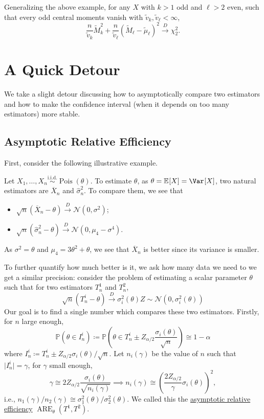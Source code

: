 Generalizing the above example, for any \(X\) with \(k > 1\) odd and \(\ell > 2\) even, such that every odd central moments vanish with \(\widetilde{v} _k , \widetilde{v} _\ell < \infty \),
\[
	\frac{n}{\widetilde{v} _k} \widetilde{M} _k^2 + \frac{n}{\widetilde{v} _\ell }(\widetilde{M} _\ell - \widetilde{\mu} _\ell )^2 \overset{D}{\to} \chi _2^2 .
\]

\section{A Quick Detour}
We take a slight detour discussing how to asymptotically compare two estimators and how to make the confidence interval (when it depends on too many estimators) more stable.

\subsection{Asymptotic Relative Efficiency}
First, consider the following illustrative example.

\begin{eg}\label{eg:ARE}
	Let \(X_1, \dots , X_n \overset{\text{i.i.d.} }{\sim } \operatorname{Pois}(\theta ) \). To estimate \(\theta \), as \(\theta = \mathbb{E}_{}[X] = \Var_{}[X] \), two natural estimators are \(\overline{X} _n\) and \(\hat{\sigma} _n^2\). To compare them, we see that
	\begin{itemize}
		\item \(\sqrt{n} (\overline{X} _n - \theta ) \overset{D}{\to} \mathcal{N} (0, \sigma ^2)\);
		\item \(\sqrt{n} (\hat{\sigma} _n^2 - \theta ) \overset{D}{\to} \mathcal{N} (0, \mu _4 - \sigma ^4)\).
	\end{itemize}
	As \(\sigma ^2 = \theta \) and \(\mu _4 = 3 \theta ^2 + \theta \), we see that \(\overline{X} _n\) is better since its variance is smaller.
\end{eg}

To further quantify how much better is it, we ask how many data we need to we get a similar precision: consider the problem of estimating a scalar parameter \(\theta \) such that for two estimators \(T_n^1\) and \(T_n^2\),
\[
	\sqrt{n} (T_n^i - \theta )
	\overset{D}{\to} \sigma _i^2(\theta ) Z \sim \mathcal{N} (0, \sigma _i^2(\theta ))
\]
Our goal is to find a single number which compares these two estimators. Firstly, for \(n\) large enough,
\[
	\mathbb{P} (\theta \in I_n^{i})
	\coloneqq \mathbb{P} \left( \theta \in T_n^i \pm Z_{\alpha / 2} \frac{\sigma _i(\theta )}{\sqrt{n} } \right)
	\cong 1 - \alpha
\]
where \(I_n^{i} \coloneqq T_n^i \pm Z_{\alpha / 2} \sigma _i(\theta ) / \sqrt{n} \). Let \(n_i(\gamma )\) be the value of \(n\) such that \(\vert I_n^{i} \vert = \gamma \), for \(\gamma \) small enough,
\[
	\gamma \cong 2 Z_{\alpha / 2} \frac{\sigma _i(\theta )}{\sqrt{n_i (\gamma )} }
	\implies n_i(\gamma ) \cong \left( \frac{2 Z_{\alpha / 2}}{\gamma } \sigma _i(\theta ) \right)^2 ,
\]
i.e., \(n_1(\gamma ) / n_2(\gamma ) \cong \sigma _1^2(\theta ) / \sigma _2^2(\theta )\). We called this the \hyperref[def:asymptotic-relative-efficiency]{asymptotic relative efficiency} \(\operatorname{ARE}_\theta (T^1, T^2) \).

